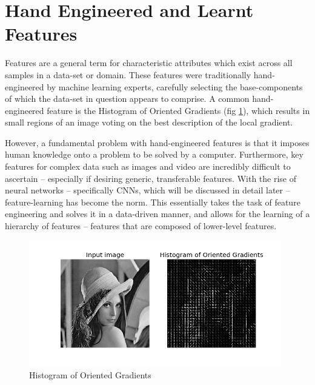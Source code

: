\documentclass{report}
\begin{document}
\section{Hand Engineered and Learnt Features} \label{hand-eng:1}
Features are a general term for characteristic attributes which exist across all samples in a data-set or domain. These features were traditionally hand-engineered by machine learning experts, carefully selecting the base-components of which the data-set in question appears to comprise. A common hand-engineered feature is the Histogram of Oriented Gradients (fig \ref{fig:hog:1}), which results in small regions of an image voting on the best description of the local gradient. \par
However, a fundamental problem with hand-engineered features is that it imposes human knowledge onto a problem to be solved by a computer. Furthermore, key features for complex data such as images and video are incredibly difficult to ascertain -- especially if desiring generic, transferable features. With the rise of neural networks -- specifically CNNs, which will be discussed in detail later -- feature-learning has become the norm. This essentially takes the task of feature engineering and solves it in a data-driven manner, and allows for the learning of  a hierarchy of features -- features that are composed of lower-level features. \par
\begin{figure}[!h]
 \centering
 \includegraphics[width=11cm]{hog}
 \caption{Histogram of Oriented Gradients}
 \label{fig:hog:1}
\end{figure}
\end{document}

